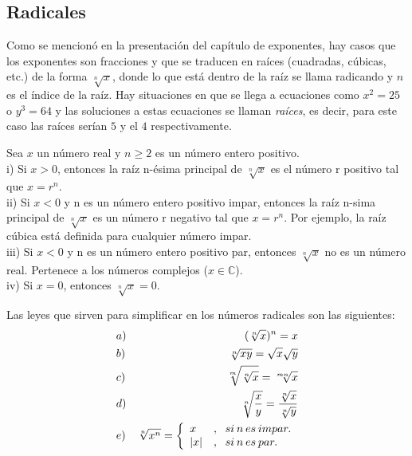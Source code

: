 \subsection{Radicales}
Como se mencionó en la presentación del capítulo de exponentes, hay casos que los exponentes son fracciones y que se traducen en raíces (cuadradas, cúbicas, etc.) de la forma $\sqrt[n]{x}$, donde lo que está dentro de la raíz se llama radicando y $n$ es el índice de la raíz. Hay situaciones en que se llega a ecuaciones como $x^{2}=25$ o $y^{3}=64$ y las soluciones a estas ecuaciones se llaman \textit{raíces}, es decir, para este caso las raíces serían $5$ y el $4$ respectivamente. 
\begin{mydef}
Sea $x$ un número real y $n\geq 2$ es un número entero positivo.\\

\noindent i) Si $x>0$, entonces la raíz n-ésima principal de $\sqrt[n]{x}$  es el número r positivo tal que $x=r^{n}$.\\

\noindent ii) Si $x<0$ y n es un número entero positivo impar, entonces la raíz n-sima principal de $\sqrt[n]{x}$ es un número r negativo tal que $x=r^{n}$. Por ejemplo, la raíz cúbica está definida para cualquier número impar. \\

\noindent iii) Si $x<0$ y n es un número entero positivo par, entonces $\sqrt[n]{x}$ no es un número real. Pertenece a los números complejos ($x\in \mathbb{C}$). \\

\noindent iv) Si $x=0$, entonces $\sqrt[n]{x}=0$. \\
\end{mydef}

Las leyes que sirven para simplificar en los números radicales son las siguientes:\\
\begin{eqnarray}
&a)& (\sqrt[n]{x})^{n}=x \\
&b)& \sqrt[n]{xy}=\sqrt{x}\sqrt{y} \\
&c)& \sqrt[m]{\sqrt[n]{x}}=\sqrt[mn]{x}\\
&d)& \sqrt[n]{\dfrac{x}{y}}=\dfrac{\sqrt[n]{x}}{\sqrt[n]{y}}\\
&e)& \sqrt[n]{x^{n}}=\left\{\begin{array}{ll}
x&,\hspace{6px} si\hspace{2px} n\hspace{2px} es\hspace{2px} impar.\\
|x|& ,\hspace{6px} si\hspace{2px} n\hspace{2px} es\hspace{2px}par.
\end{array} \right.
\end{eqnarray}

